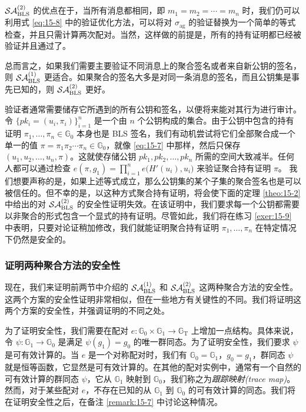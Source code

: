 $\mathcal{SA}_{\rm BLS}^{(2)}$ 的优点在于，当所有消息都相同，即 $m_1=m_2=\cdots=m_n$ 时，我们仍可以利用式 \ref{eq:15-8} 中的验证优化方法，可以将对 $\sigma_\mathrm{ag}$ 的验证替换为一个简单的等式检查，并且只需计算两次配对。当然，这样做的前提是，所有的持有证明都已经被验证并且通过了。

总而言之，如果我们需要主要验证不同消息上的聚合签名或者来自新公钥的签名，则 $\mathcal{SA}_{\rm BLS}^{(1)}$ 更适合。如果聚合的签名大多是对同一条消息的签名，而且公钥集是事先已知的，则 $\mathcal{SA}_{\rm BLS}^{(2)}$ 更好。

\begin{remark}[聚合持有证明]\label{remark:15-6}
验证者通常需要储存它所遇到的所有公钥和签名，以便将来能对其行为进行审计。令 $\{pk_i=(u_i,\pi_i)\}_{i=1}^{n}$ 是一个由 $n$ 个公钥构成的集合。由于公钥中包含的持有证明 $\pi_1,\dots,\pi_n\in\mathbb{G}_0$ 本身也是 BLS 签名，我们有动机尝试将它们全部聚合成一个单一的值 $\pi=\pi_1\pi_2\cdots\pi_n\in\mathbb{G}_0$，就像 \ref{eq:15-7} 中那样，然后只保存 $(u_1,u_2,\dots,u_n,\pi)$。这就使存储公钥 $pk_1,pk_2,\dots,pk_n$ 所需的空间大致减半。任何人都可以通过检查 $e(\pi,g_1)=\prod_{i=1}^ne\big(H'(u_i),u_i\big)$ 来验证聚合持有证明 $\pi$。
我们想要声称的是，如果上述等式成立，那么公钥集的某个子集的聚合签名也是可以被信任的。但不幸的是，以这种方式聚合持有证明，将会使下面的定理 \ref{theo:15-2} 中给出的对 $\mathcal{SA}_{\rm BLS}^{(2)}$ 的安全性证明失效。在该证明中，我们要求每一个公钥都需要以非聚合的形式包含一个显式的持有证明。尽管如此，我们将在练习 \ref{exer:15-9} 中表明，只要对论证稍加修改，我们就能证明聚合持有证明 $\pi_1,\dots,\pi_n$ 在特定情况下仍然是安全的。
\end{remark}

\subsubsection{证明两种聚合方法的安全性}\label{subsubsec:15-5-3-3}

现在，我们来证明前两节中介绍的 $\mathcal{SA}_{\rm BLS}^{(1)}$ 和 $\mathcal{SA}_{\rm BLS}^{(2)}$ 这两种聚合方法的安全性。这两个方案的安全性证明非常相似，但在一些地方有关键性的不同。我们将证明这两个方案的安全性，并强调证明的不同之处。

为了证明安全性，我们需要在配对 $e:\mathbb{G}_0\times\mathbb{G}_1\to\mathbb{G}_\mathrm{T}$ 上增加一点结构。具体来说，令 $\psi:\mathbb{G}_1\to\mathbb{G}_0$ 是满足 $\psi(g_1)=g_0$ 的唯一群同态。为了证明安全性，我们要求 $\psi$ 是可有效计算的。当 $e$ 是一个对称配对时，我们有 $\mathbb{G}_0=\mathbb{G}_1$，$g_0=g_1$，群同态 $\psi$ 就是恒等函数，它显然是可有效计算的。在其他的配对实例中，通常有一个自然的可有效计算的群同态 $\psi$，它从 $\mathbb{G}_1$ 映射到 $\mathbb{G}_0$，我们称之为\emph{跟踪映射(trace map)}。然而，对于某些配对 $e$，不存在已知的从 $\mathbb{G}_1$ 到 $\mathbb{G}_0$ 的可有效计算的同态。我们将在证明安全性之后，在备注 \ref{remark:15-7} 中讨论这种情况。

